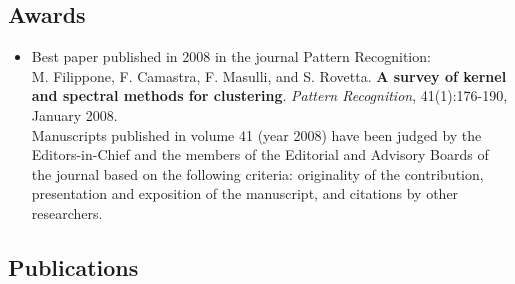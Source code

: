 \documentclass[a4paper,10pt]{article}
\begin{document}

\newpage

\subsection*{Awards}
\begin{itemize}
     \item Best paper published in 2008 in the journal Pattern Recognition:
       \\M. Filippone, F. Camastra, F. Masulli, and S. Rovetta.
       \textbf{A survey of kernel and spectral methods for clustering}.
       \emph{Pattern Recognition}, 41(1):176-190, January 2008.
       \\Manuscripts published in volume 41 (year 2008) have been judged by the Editors-in-Chief and the members of the Editorial and Advisory Boards of the journal based on the following criteria: originality of the contribution, presentation and exposition of the manuscript, and citations by other researchers.
\end{itemize}

\subsection*{Publications}
\end{document}
